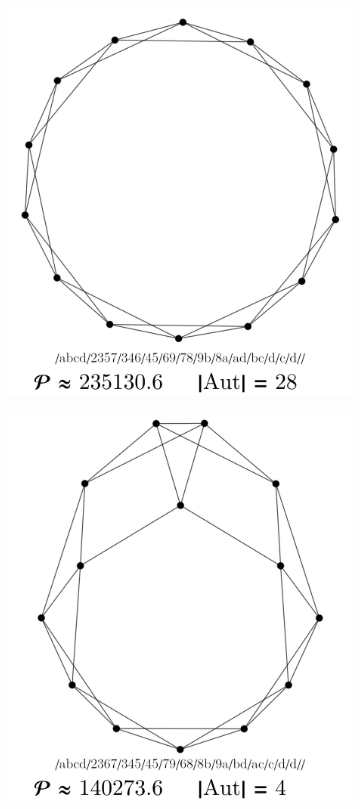 \documentclass[11pt,a4paper]{article}
\renewcommand{\|}{\rule[-0.4ex]{0.2ex}{1.2em}}
\begin{document}
\begin{figure}[htb]
	\begin{subfigure}[b]{.24 \textwidth}
		\includegraphics[width=\linewidth]{largest_12_1}
		\subcaption{}
	\end{subfigure}
	\begin{subfigure}[b]{.24 \textwidth}
		\includegraphics[width=\linewidth]{largest_12_2}

\end{subfigure}
\end{figure}
\end{document}
